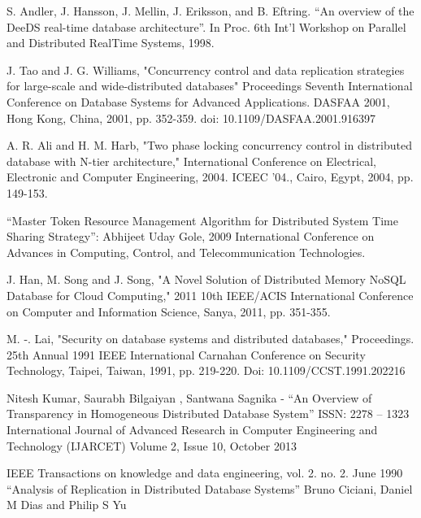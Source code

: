 \documentclass{article}[12pt,a4paper]
\begin{document}
\begin{thebibliography}{1}
 S. Andler, J. Hansson, J. Mellin, J. Eriksson, and B. Eftring. “An overview of the DeeDS real-time database architecture”. In Proc. 6th Int’l Workshop on Parallel and Distributed RealTime Systems, 1998.

 J. Tao and J. G. Williams, "Concurrency control and data replication strategies for large-scale and wide-distributed databases" Proceedings Seventh International Conference on Database Systems for Advanced Applications. DASFAA 2001, Hong Kong, China, 2001, pp. 352-359. doi: 10.1109/DASFAA.2001.916397

 A. R. Ali and H. M. Harb, "Two phase locking concurrency control in distributed database with N-tier architecture," International Conference on Electrical, Electronic and Computer Engineering, 2004. ICEEC '04., Cairo, Egypt, 2004, pp. 149-153.

 “Master Token Resource Management Algorithm for Distributed System
Time Sharing Strategy”: Abhijeet Uday Gole, 2009 International Conference on Advances in Computing, Control, and Telecommunication Technologies.

 J. Han, M. Song and J. Song, "A Novel Solution of Distributed Memory NoSQL Database for Cloud Computing," 2011 10th IEEE/ACIS International Conference on Computer and Information Science, Sanya, 2011, pp. 351-355.

 M. -. Lai, "Security on database systems and distributed databases," Proceedings. 25th Annual 1991 IEEE International Carnahan Conference on Security Technology, Taipei, Taiwan, 1991, pp. 219-220. Doi: 10.1109/CCST.1991.202216

 Nitesh Kumar, Saurabh Bilgaiyan , Santwana Sagnika - “An Overview of Transparency in Homogeneous Distributed Database System” ISSN: 2278 – 1323 International Journal of Advanced Research in Computer Engineering and Technology (IJARCET) Volume 2, Issue 10, October 2013

 IEEE Transactions on knowledge and data engineering, vol. 2. no. 2. June 1990 “Analysis of Replication in Distributed Database Systems”  Bruno Ciciani, Daniel M Dias and Philip S Yu


\end{thebibliography}
\end{document}
